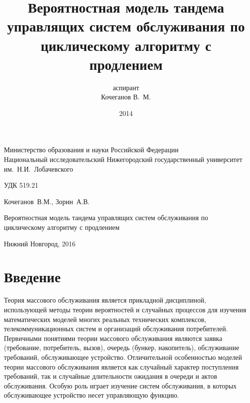 \documentclass[a4paper,12pt,russian]{extarticle}
\title{Вероятностная модель тандема управлящих систем обслуживания по циклическому алгоритму с продлением}
\author{аспирант \\ Кочеганов В.~М.}
\date{2014}
\begin{document}
\begin{titlepage}
\large
\begin{center}
Министерство образования и науки Российской Федерации\\
Национальный исследовательский Нижегородский государственный университет им.~Н.И.~Лобачевского 

\medskip

\begin{flushright}
УДК 519.21
\end{flushright}

\vfill

Кочеганов~В.М., Зорин~А.В.

\medskip

Вероятностная модель тандема управлящих систем обслуживания по циклическому алгоритму с продлением

\vfill

Нижний Новгород, 2016
\end{center}
\end{titlepage}

\tableofcontents

\setcounter{page}{2}
\section{Введение}
Теория массового обслуживания является прикладной дисциплиной, использующей методы теории вероятностей и случайных процессов для  изучения математических моделей многих реальных технических комплексов, телекоммуникационных систем и организаций обслуживания потребителей. 
Первичными понятиями теории массового обслуживания являются заявка (требование, потребитель, вызов), очередь (бункер, накопитель), обслуживание требований, обслуживающее устройство.
Отличительной особенностью моделей теории массового обслуживания является как случайный характер поступления требований, так и случайные длительности ожидания в очереди и актов обслуживания.
Особую роль играет изучение систем обслуживания, в которых обслуживающее устройство несет управляющую функцию.
\end{document}

